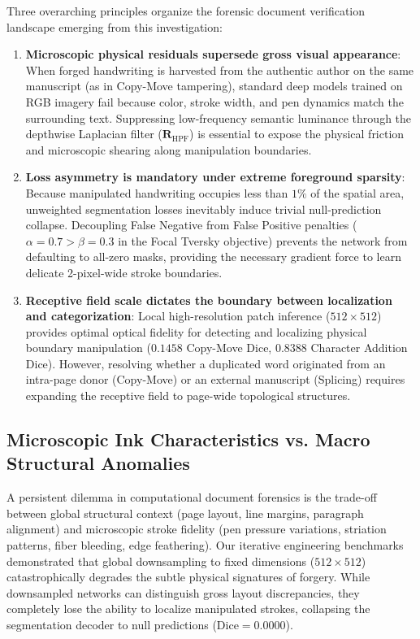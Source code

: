\documentclass[pdflatex,sn-mathphys-num,iicol]{sn-jnl}
\begin{document}
Three overarching principles organize the forensic document verification landscape emerging from this investigation:
\begin{enumerate}[1.]
    \item \textbf{Microscopic physical residuals supersede gross visual appearance}: When forged handwriting is harvested from the authentic author on the same manuscript (as in Copy-Move tampering), standard deep models trained on RGB imagery fail because color, stroke width, and pen dynamics match the surrounding text. Suppressing low-frequency semantic luminance through the depthwise Laplacian filter ($\mathbf{R}_{\text{HPF}}$) is essential to expose the physical friction and microscopic shearing along manipulation boundaries.
    \item \textbf{Loss asymmetry is mandatory under extreme foreground sparsity}: Because manipulated handwriting occupies less than $1\%$ of the spatial area, unweighted segmentation losses inevitably induce trivial null-prediction collapse. Decoupling False Negative from False Positive penalties ($\alpha = 0.7 > \beta = 0.3$ in the Focal Tversky objective) prevents the network from defaulting to all-zero masks, providing the necessary gradient force to learn delicate 2-pixel-wide stroke boundaries.
    \item \textbf{Receptive field scale dictates the boundary between localization and categorization}: Local high-resolution patch inference ($512 \times 512$) provides optimal optical fidelity for detecting and localizing physical boundary manipulation ($0.1458$ Copy-Move Dice, $0.8388$ Character Addition Dice). However, resolving whether a duplicated word originated from an intra-page donor (Copy-Move) or an external manuscript (Splicing) requires expanding the receptive field to page-wide topological structures.
\end{enumerate}

\subsection{Microscopic Ink Characteristics vs. Macro Structural Anomalies}
A persistent dilemma in computational document forensics is the trade-off between global structural context (page layout, line margins, paragraph alignment) and microscopic stroke fidelity (pen pressure variations, striation patterns, fiber bleeding, edge feathering). Our iterative engineering benchmarks demonstrated that global downsampling to fixed dimensions ($512 \times 512$) catastrophically degrades the subtle physical signatures of forgery. While downsampled networks can distinguish gross layout discrepancies, they completely lose the ability to localize manipulated strokes, collapsing the segmentation decoder to null predictions ($\text{Dice} = 0.0000$).
\end{document}
